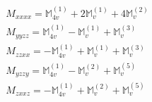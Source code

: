 \documentclass[fleqn,8pt,landscape]{jsarticle}
\begin{document}
\begin{align*}
& M_{xxxx} = \mathbb{M}_{4v}^{(1)} + 2 \mathbb{M}_{v}^{(1)} + 4 \mathbb{M}_{v}^{(2)} \\
& M_{yyzz} = \mathbb{M}_{4v}^{(1)} - \mathbb{M}_{v}^{(1)} + \mathbb{M}_{v}^{(3)} \\
& M_{zzxx} = - \mathbb{M}_{4v}^{(1)} + \mathbb{M}_{v}^{(1)} + \mathbb{M}_{v}^{(3)} \\
& M_{yzzy} = \mathbb{M}_{4v}^{(1)} - \mathbb{M}_{v}^{(2)} + \mathbb{M}_{v}^{(5)} \\
& M_{zxxz} = - \mathbb{M}_{4v}^{(1)} + \mathbb{M}_{v}^{(2)} + \mathbb{M}_{v}^{(5)}
\end{align*}
\end{document}
